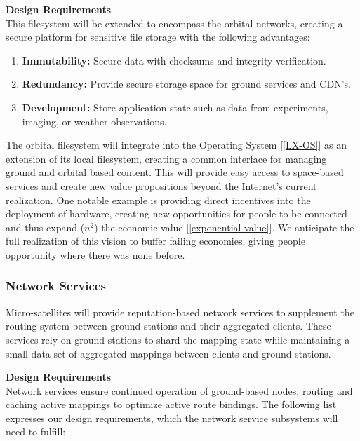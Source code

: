 \documentclass[11pt]{article}
\begin{document}
{\noindent\textbf{Design Requirements}} \\

\noindent This filesystem will be extended to encompass the orbital networks, creating a secure platform for sensitive file storage with the following advantages:

\begin{enumerate}
    \item \textbf{Immutability:} Secure data with checksums and integrity verification.
    \item \textbf{Redundancy:} Provide secure storage space for ground services and CDN's.
    \item \textbf{Development:} Store application state such as data from experiments, imaging, or weather observations.
\end{enumerate}

\noindent The orbital filesystem will integrate into the Operating System [\ref{LX-OS}] as an extension of its local filesystem, creating a common interface for managing ground and orbital based content.
This will provide easy access to space-based services and create new value propositions beyond the Internet's current realization. 
One notable example is providing direct incentives into the deployment of hardware, creating new opportunities for people to be connected and thus expand ($n^2$) the economic value [\ref{exponential-value}].
We anticipate the full realization of this vision to buffer failing economies, giving people opportunity where there was none before.


\subsubsection{Network Services}

\noindent Micro-satellites will provide reputation-based network services to supplement the routing system between ground stations and their aggregated clients.
These services rely on ground stations to shard the mapping state while maintaining a small data-set of aggregated mappings between clients and ground stations.

\bigskip
{\noindent\textbf{Design Requirements}} \\

\noindent Network services ensure continued operation of ground-based nodes, routing and caching active mappings to optimize active route bindings.
The following list expresses our design requirements, which the network service subsystems will need to fulfill:
\end{document}
